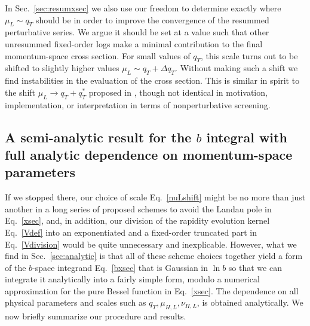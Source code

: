 \documentclass[a4,letterpaper,11pt]{article}
\newcommand{\eq}[1]{Eq.~\eqref{#1}}
\renewcommand{\sec}[1]{Sec.~\ref{sec:#1}}
\begin{document}
In \sec{resumxsec} we also use our freedom to determine exactly where $\mu_L\sim q_T$ should be in order to improve the convergence of the resummed perturbative series. We argue it should be set at a value such that other unresummed fixed-order logs make a minimal contribution to the final momentum-space cross section. For small values of $q_T$, this scale turns out to be shifted to slightly higher values $\mu_L\sim q_T + \Delta q_T$. Without making such a shift we find instabilities in the evaluation of the cross section. This is similar in spirit to the shift $\mu_L\to q_T+q_T^*$ proposed in \cite{Becher:2011xn,Becher:2012yn}, though not identical in motivation, implementation, or interpretation in terms of nonperturbative screening.

\subsection{A semi-analytic result for the $b$ integral with full analytic dependence on momentum-space parameters}
\label{ssec:intro3}

If we stopped there, our choice of scale \eq{nuLshift} might be no more than just another in a long series of proposed schemes to avoid the Landau pole in \eq{xsec}, and, in addition, our division of the rapidity evolution kernel \eq{Vdef} into an exponentiated and a fixed-order truncated part in \eq{Vdivision} would be quite unnecessary and inexplicable. However, what we find in \sec{analytic} is that all of these scheme choices together yield a form of the $b$-space integrand \eq{bxsec} that is Gaussian in $\ln b$ so that we can integrate it analytically into a fairly simple form, modulo a numerical approximation for the pure Bessel function in \eq{xsec}. The dependence on all physical parameters and scales such as $q_T,\mu_{H,L},\nu_{H,L}$, is obtained analytically. We now briefly summarize our procedure and results.
\end{document}
